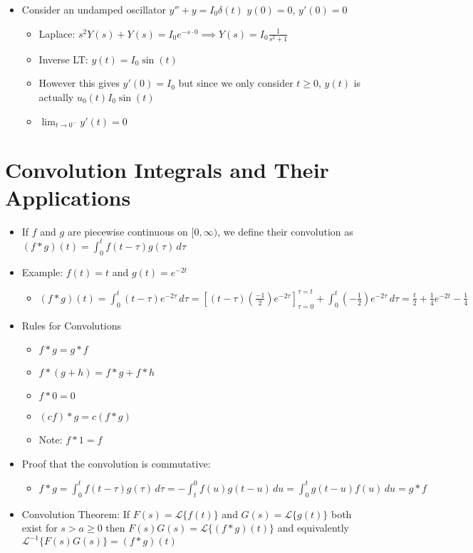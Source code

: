 \documentclass[12pt]{article}
\begin{document}
\begin{itemize}
    \item Consider an undamped oscillator $y'' + y = I_0 \delta(t)$ $y(0) = 0$, $y'(0) = 0$ \begin{itemize}
        \item Laplace: $s^2 Y(s) + Y(s) = I_0 e^{-s \cdot 0} \implies Y(s) = I_0 \frac{1}{s^2+1}$
        \item Inverse LT: $y(t) = I_0 \sin (t)$
        \item However this gives $y'(0) = I_0$ but since we only consider $t \geq 0$, $y(t)$ is actually  $u_0 (t) I_0 \sin(t)$
        \item $\lim_{t \rightarrow 0^{-}} y'(t) = 0$
    \end{itemize}
\end{itemize}

\section{Convolution Integrals and Their Applications} \begin{itemize}
    \item If $f$ and $g$ are piecewise continuous on $[0, \infty)$, we define their convolution as $(f * g)(t) = \int_{0}^{t} f(t- \tau) g(\tau ) \, d \tau$
    \item Example: $f(t) = t$ and $g(t) = e^{-2t}$ \begin{itemize}
        \item $(f * g)(t) = \int_{0}^{t} (t - \tau) e^{-2 \tau} \, d \tau = [(t - \tau) (\frac{-1}{2}) e^{-2 \tau}]_{\tau = 0}^{\tau = t} + \int_{0}^{t} (-\frac{1}{2}) e^{-2 \tau} \, d \tau = \frac{t}{2} + \frac{1}{4} e^{-2t} - \frac{1}{4}$
    \end{itemize}
    \item Rules for Convolutions \begin{itemize}
        \item $f * g = g * f$
        \item $f * (g+h) = f*g + f*h$
        \item $f * 0 = 0$
        \item $(cf) * g = c(f * g)$
        \item Note: $f * 1 = f$
    \end{itemize}
    \item Proof that the convolution is commutative: \begin{itemize}
        \item $f * g = \int_{0}^{t} f(t - \tau) g(\tau) \, d \tau = - \int_{t}^{0} f(u) g(t-u) \, du = \int_{0}^{t} g(t-u) f(u) \, du = g * f$
    \end{itemize}
    \item Convolution Theorem: If $F(s) = \mathcal{L} \{ f(t) \}$ and $G(s) = \mathcal{L} \{ g(t) \}$ both exist for $s > a \geq 0$ then $F(s) G(s) = \mathcal{L} \{ (f*g) (t) \}$ and equivalently $\mathcal{L}^{-1} \{ F(s) G(s) \} = (f * g) (t)$
\end{itemize}
\end{document}
